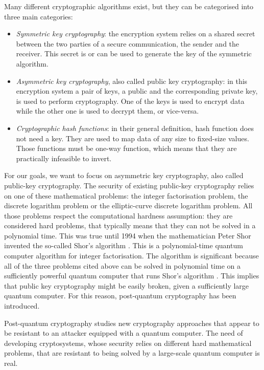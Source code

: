 \documentclass[a4paper,12pt]{article}
\begin{document}
Many different cryptographic algorithms exist, but they can be categorised into three main categories:

\begin{itemize}
	\item \textit{Symmetric key cryptography}: the encryption system relies on a shared secret between the two parties of a secure communication, the sender and the receiver. This secret is or can be used to generate the key of the symmetric algorithm.
	\item \textit{Asymmetric key cryptography}, also called public key cryptography: in this encryption system a pair of keys, a public and the corresponding private key, is used to perform cryptography. One of the keys is used to encrypt data while the other one is used to decrypt them, or vice-versa.
	\item \textit{Cryptographic hash functions}: in their general definition, hash function does not need a key. They are used to map data of any size to fixed-size values. Those functions must be one-way function, which means that they are practically infeasible to invert.
\end{itemize}

For our goals, we want to focus on asymmetric key cryptography, also called public-key cryptography.
The security of existing public-key cryptography relies on one of these mathematical problems: the integer factorisation problem, the discrete logarithm problem or the elliptic-curve discrete logarithm problem. All those problems respect the computational hardness assumption: they are considered hard problems, that typically means that they can not be solved in a polynomial time.
This was true until 1994 when the mathematician Peter Shor invented the so-called Shor's algorithm \cite{15_ShorPolynomial}. This is a polynomial-time quantum computer algorithm for integer factorisation.
The algorithm is significant because all of the three problems cited above can be solved in polynomial time on a sufficiently powerful quantum computer that runs Shor's algorithm \cite{14_bernsteinPQC}. This implies that public key cryptography might be easily broken, given a sufficiently large quantum computer. For this reason, post-quantum cryptography has been introduced.

Post-quantum cryptography studies new cryptography approaches that appear to be resistant to an attacker equipped with a quantum computer. The need of developing cryptosystems, whose security relies on different hard mathematical problems, that are resistant to being solved by a large-scale quantum computer is real.
\end{document}
